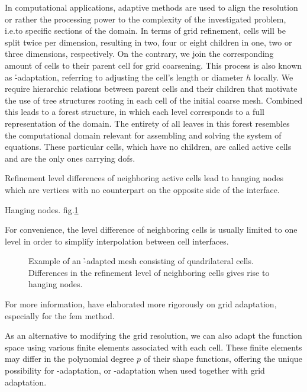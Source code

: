 In computational applications, adaptive methods are used to align the resolution or rather the processing power to the complexity of the investigated problem, i.e.\@ to specific sections of the domain. In terms of grid refinement, cells will be split twice per dimension, resulting in two, four or eight children in one, two or three dimensions, respectively. On the contrary, we join the corresponding amount of cells to their parent cell for grid coarsening. This process is also known as \h-adaptation, referring to adjusting the cell's length or diameter \(h\) locally. We require hierarchic relations between parent cells and their children that motivate the use of tree structures rooting in each cell of the initial coarse mesh. Combined this leads to a forest structure, in which each level corresponds to a full representation of the domain. The entirety of all leaves in this forest resembles the computational domain relevant for assembling and solving the system of equations. These particular cells, which have no children, are called active cells and are the only ones carrying \glspl{dof}.

Refinement level differences of neighboring active cells lead to hanging nodes which are vertices with no counterpart on the opposite side of the interface.

Hanging nodes.
fig.\@ \ref{fig:hangingnodes}

For convenience, the level difference of neighboring cells is usually limited to one level in order to simplify interpolation between cell interfaces.



\begin{figure}
  \centering
  \caption{Example of an \h-adapted mesh consisting of quadrilateral cells. Differences in the refinement level of neighboring cells gives rise to hanging nodes.}
  \label{fig:hangingnodes}
\end{figure}

For more information, \textcite{bangerth2003} have elaborated more rigorously on grid adaptation, especially for the \gls{fem} method.

As an alternative to modifying the grid resolution, we can also adapt the function space using various finite elements associated with each cell. These finite elements may differ in the polynomial degree $p$ of their shape functions, offering the unique possibility for \p-adaptation, or \hp-adaptation when used together with grid adaptation.

